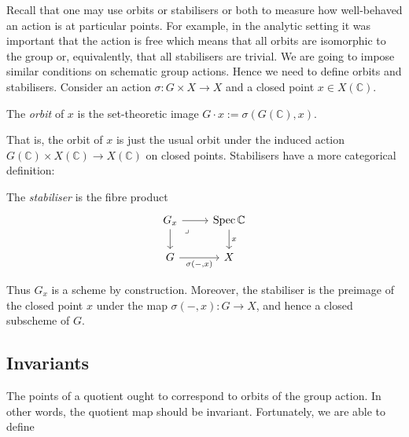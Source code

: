 \documentclass[12pt]{ociamthesis}  %
\begin{document}
Recall that one may use orbits or stabilisers or both to measure
how well-behaved an action is at particular points. For example,
in the analytic setting it was important that the action is free
which means that all orbits are isomorphic to the group
or, equivalently, that all stabilisers are trivial.
We are going to impose similar conditions on schematic
group actions. Hence we need to define orbits and stabilisers.
Consider an action $\sigma : G\times X\to X$ and a closed point
$x \in X(\mathbb C)$.

\begin{definition}
  The \emph{orbit} of $x$ is the set-theoretic image
  $G\cdot x := \sigma(G(\mathbb C),x)$.
\end{definition}

That is, the orbit of $x$ is just the usual orbit under the induced
action $G(\mathbb C)\times X(\mathbb C) \to X(\mathbb C)$ on closed
points. Stabilisers have a more categorical definition:

\begin{definition}
  The \emph{stabiliser} is the fibre product
  \begin{equation*}
    \begin{tikzcd}
      {G_x} & {\Spec\mathbb  C} \\
      G & X
      \arrow[from=1-1, to=1-2]
      \arrow[from=1-1, to=2-1]
      \arrow["\lrcorner"{anchor=center, pos=0.125}, draw=none, from=1-1, to=2-2]
      \arrow["x", from=1-2, to=2-2]
      \arrow["{\sigma(-,x)}"', from=2-1, to=2-2]
    \end{tikzcd}
  \end{equation*}
\end{definition}

Thus $G_x$ is a scheme by construction. Moreover, the stabiliser is the
preimage of the closed point $x$ under the map
$\sigma(-,x) : G\to X$, and hence a closed subscheme of $G$.

\subsection{Invariants}

The points of a quotient ought to correspond to orbits of the group
action. In other words, the quotient map should be invariant.
Fortunately, we are able to define
\end{document}
